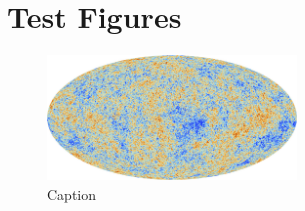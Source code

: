 
\section{Test Figures}
\label{sec:figs}

\begin{figure}[htbp!]
\hspace{0.1in}
\includegraphics[height=1.3in]{Figures/cmb.jpg}   
\hspace{0.2in}
\centering
\caption{ \small \setlength{\baselineskip}{0.95\baselineskip}
Caption}
\label{fig:cmb} 
\vspace{-0.05in}
\end{figure}




 

